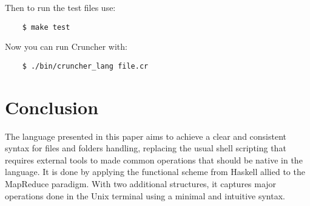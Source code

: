 \documentclass{article}
\begin{document}
Then to run the test files use:
\begin{verbatim}
    $ make test
\end{verbatim}

Now you can run Cruncher with:
\begin{verbatim}
    $ ./bin/cruncher_lang file.cr
\end{verbatim}

\section{Conclusion}
\label{sec:conclusion}
The language presented in this paper aims to achieve a clear and consistent
syntax for files and folders handling, replacing the usual shell scripting that
requires external tools to made common operations that should be native in the
language. It is done by applying the functional scheme from Haskell allied to
the MapReduce paradigm. With two additional structures, it captures major
operations done in the Unix terminal using a minimal and intuitive syntax.



\end{document}
